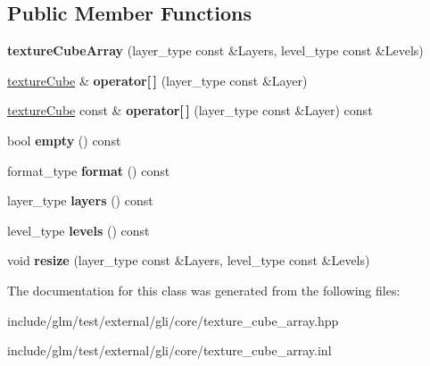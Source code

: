 \subsection*{\-Public \-Member \-Functions}
\begin{DoxyCompactItemize}
\item 
\hypertarget{classgli_1_1textureCubeArray_a71201941b260523ac5ed5666a4c566a1}{{\bfseries texture\-Cube\-Array} (layer\-\_\-type const \&\-Layers, level\-\_\-type const \&\-Levels)}\label{classgli_1_1textureCubeArray_a71201941b260523ac5ed5666a4c566a1}

\item 
\hypertarget{classgli_1_1textureCubeArray_a86e307b437b0109738dc4ec4556a72ab}{\hyperlink{classgli_1_1textureCube}{texture\-Cube} \& {\bfseries operator\mbox{[}$\,$\mbox{]}} (layer\-\_\-type const \&\-Layer)}\label{classgli_1_1textureCubeArray_a86e307b437b0109738dc4ec4556a72ab}

\item 
\hypertarget{classgli_1_1textureCubeArray_a09da9d38ac3c407ed50b5e6313fa5a22}{\hyperlink{classgli_1_1textureCube}{texture\-Cube} const \& {\bfseries operator\mbox{[}$\,$\mbox{]}} (layer\-\_\-type const \&\-Layer) const }\label{classgli_1_1textureCubeArray_a09da9d38ac3c407ed50b5e6313fa5a22}

\item 
\hypertarget{classgli_1_1textureCubeArray_a68deddd97ed4e57d1a720dcb0c6af5fc}{bool {\bfseries empty} () const }\label{classgli_1_1textureCubeArray_a68deddd97ed4e57d1a720dcb0c6af5fc}

\item 
\hypertarget{classgli_1_1textureCubeArray_af6c556929d6c94a291fe9d4786c7741b}{format\-\_\-type {\bfseries format} () const }\label{classgli_1_1textureCubeArray_af6c556929d6c94a291fe9d4786c7741b}

\item 
\hypertarget{classgli_1_1textureCubeArray_a9e30884e3a82701c296252db44c32524}{layer\-\_\-type {\bfseries layers} () const }\label{classgli_1_1textureCubeArray_a9e30884e3a82701c296252db44c32524}

\item 
\hypertarget{classgli_1_1textureCubeArray_a9721096ebe3f4a6648c3eedd5b0fb995}{level\-\_\-type {\bfseries levels} () const }\label{classgli_1_1textureCubeArray_a9721096ebe3f4a6648c3eedd5b0fb995}

\item 
\hypertarget{classgli_1_1textureCubeArray_a757fddd2585c5943d91ed329db9fea5b}{void {\bfseries resize} (layer\-\_\-type const \&\-Layers, level\-\_\-type const \&\-Levels)}\label{classgli_1_1textureCubeArray_a757fddd2585c5943d91ed329db9fea5b}

\end{DoxyCompactItemize}


\-The documentation for this class was generated from the following files\-:\begin{DoxyCompactItemize}
\item 
include/glm/test/external/gli/core/texture\-\_\-cube\-\_\-array.\-hpp\item 
include/glm/test/external/gli/core/texture\-\_\-cube\-\_\-array.\-inl\end{DoxyCompactItemize}
